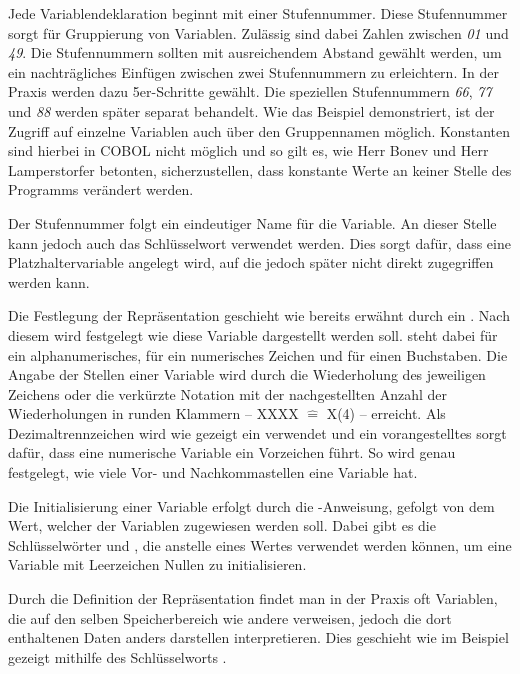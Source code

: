 Jede Variablendeklaration beginnt mit einer Stufennummer. Diese Stufennummer sorgt für Gruppierung von Variablen. Zulässig sind dabei Zahlen zwischen \textit{01} und \textit{49}. Die Stufennummern sollten mit ausreichendem Abstand gewählt werden, um ein nachträgliches Einfügen zwischen zwei Stufennummern zu erleichtern. In der Praxis werden dazu \idR 5er-Schritte gewählt. Die speziellen Stufennummern \textit{66}, \textit{77} und \textit{88} werden später separat behandelt. Wie das Beispiel demonstriert, ist der Zugriff auf einzelne Variablen auch über den Gruppennamen möglich. Konstanten sind hierbei in COBOL nicht möglich und so gilt es, wie Herr Bonev und Herr Lamperstorfer betonten, sicherzustellen, dass konstante Werte an keiner Stelle des Programms verändert werden.

Der Stufennummer folgt ein eindeutiger Name für die Variable. An dieser Stelle kann jedoch auch das Schlüsselwort  verwendet werden. Dies sorgt dafür, dass eine Platzhaltervariable angelegt wird, auf die jedoch später nicht direkt zugegriffen werden kann.

Die Festlegung der Repräsentation geschieht wie bereits erwähnt durch ein . Nach diesem  wird festgelegt wie diese Variable dargestellt werden soll.  steht dabei für ein alphanumerisches,  für ein numerisches Zeichen und  für einen Buchstaben. Die Angabe der Stellen einer Variable wird durch die Wiederholung des jeweiligen Zeichens oder die verkürzte Notation mit der nachgestellten Anzahl der Wiederholungen in runden Klammern -- \zB XXXX $\widehat{=}$ X(4) -- erreicht. Als Dezimaltrennzeichen wird wie gezeigt ein  verwendet und ein vorangestelltes  sorgt dafür, dass eine numerische Variable ein Vorzeichen führt. So wird genau festgelegt, wie viele Vor- und Nachkommastellen eine Variable hat.

Die Initialisierung einer Variable erfolgt durch die -Anweisung, gefolgt von dem Wert, welcher der Variablen zugewiesen werden soll. Dabei gibt es die Schlüsselwörter  \bzw {} und  \bzw {}, die anstelle eines Wertes verwendet werden können, um eine Variable mit Leerzeichen \bzw Nullen zu initialisieren.

Durch die Definition der Repräsentation findet man in der Praxis oft Variablen, die auf den selben Speicherbereich wie andere verweisen, jedoch die dort enthaltenen Daten anders darstellen \bzw interpretieren. Dies geschieht wie im Beispiel gezeigt mithilfe des Schlüsselworts .

